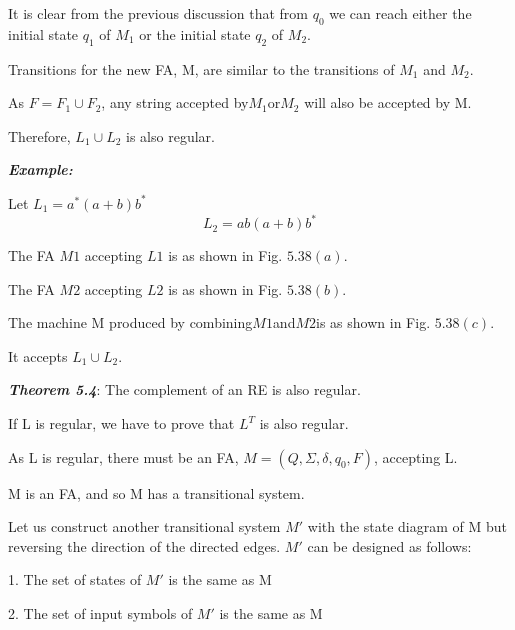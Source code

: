 \documentclass[10pt,a4paper]{book}
\begin{document}
It is clear from the previous discussion that from $q_{0}$ we can reach either the initial state $q_{1}$ of $M_{1}$ or the initial state $q_{2}$ of $M_{2}$.

Transitions for the new FA, M, are similar to the transitions of $M_{1}$ and $M_{2}$.

As $F = F_{1} \cup F_{2}$, any string accepted by$M_{1}$or$M_{2}$ will also be accepted by M.

Therefore, $L_{1} \cup L_{2}$ is also regular.

\emph{\textbf{Example:}}

Let\qquad\qquad\qquad\qquad\qquad\; $L_{1} = a^{*}(a + b)b^{*}$
$$L_{2} = ab(a + b)b^{*}$$

The FA $M1$ accepting $L1$ is as shown in Fig. $5.38(a)$.

The FA $M2$ accepting $L2$ is as shown in Fig. $5.38(b)$.

The machine M produced by combining$M1$and$M2$is as shown in Fig. $5.38(c)$.

It accepts $L_{1} \cup L_{2}$.

\emph{\textbf{Theorem 5.4}}: The complement of an RE is also regular.

If L is regular, we have to prove that $L^{T}$ is also regular.

\qquad As L is regular, there must be an FA, $M = (Q, \Sigma, \delta, q_{0}, F)$, accepting L.

M is an FA, and so M has a transitional system.

\quad Let us construct another transitional system $M\prime$ with the state diagram of M but reversing the direction of the directed edges. $M\prime$ can be designed as follows:

1. The set of states of $M\prime$ is the same as M

2. The set of input symbols of $M\prime$ is the same as M
\end{document}
